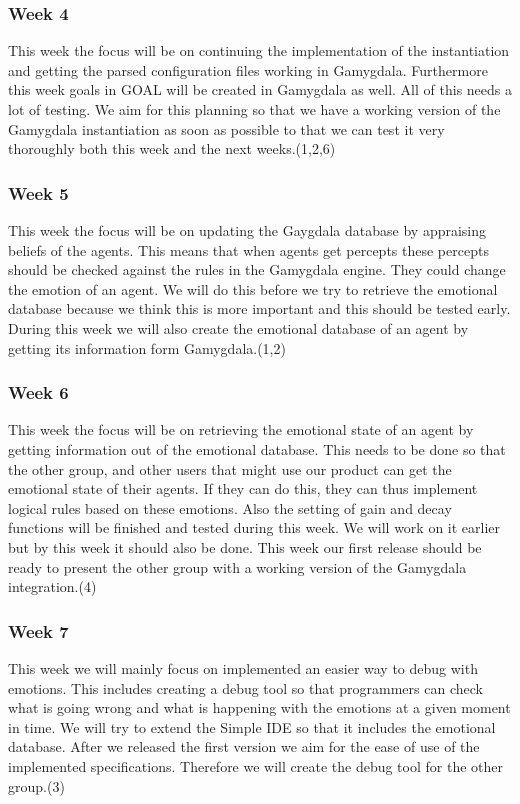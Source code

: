 \documentclass[]{article}
\begin{document}
\subsubsection*{Week 4}
This week the focus will be on continuing the implementation of the instantiation and getting the parsed configuration files working in Gamygdala. Furthermore this week goals in GOAL will be created in Gamygdala as well. All of this needs a lot of testing. We aim for this planning so that we have a working version of the Gamygdala instantiation as soon as possible to that we can test it very thoroughly both this week and the next weeks.(1,2,6)

\subsubsection*{Week 5}
This week the focus will be on updating the Gaygdala database by appraising beliefs of the agents. This means that when agents get percepts these percepts should be checked against the rules in the Gamygdala engine. They could change the emotion of an agent. We will do this before we try to retrieve the emotional database because we think this is more important and this should be tested early. During this week we will also create the emotional database of an agent by getting its information form Gamygdala.(1,2)


\subsubsection*{Week 6}
This week the focus will be on retrieving the emotional state of an agent by getting information out of the emotional database. This needs to be done so that the other group, and other users that might use our product can get the emotional state of their agents. If they can do this, they can thus implement logical rules based on these emotions. Also the setting of gain and decay functions will be finished and tested during this week. We will work on it earlier but by this week it should also be done. This week our first release should be ready to present the other group with a working version of the Gamygdala integration.(4)


\subsubsection*{Week 7}
This week we will mainly focus on implemented an easier way to debug with emotions. This includes creating a debug tool so that programmers can check what is going wrong and what is happening with the emotions at a given moment in time. We will try to extend the Simple IDE \cite{SimpleIDE} so that it includes the emotional database.
After we released the first version we  aim for the ease of use of the implemented specifications. Therefore we will create the debug tool for the other group.(3)
\end{document}
